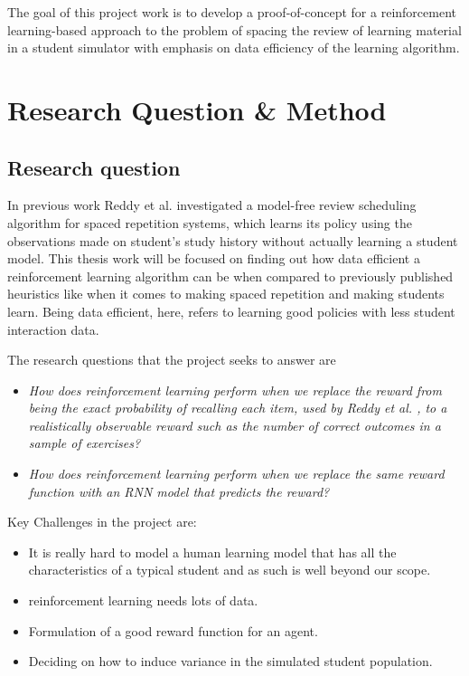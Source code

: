 \documentclass[12pt]{article}
\begin{document}
The goal of this project work is to develop a proof-of-concept for a reinforcement learning-based approach to the problem of spacing the review of learning material in a student simulator with emphasis on data efficiency of the learning algorithm.


\section{Research Question \& Method}
\subsection{Research question}
In previous work Reddy et al. \cite{reddy} investigated a model-free review scheduling algorithm for spaced repetition systems{\color{blue},} which learns its policy using the observations made on student’s study history without actually learning a student model. This thesis work will be focused on finding out how data efficient a reinforcement learning algorithm can be when compared to previously published heuristics like \cite{leitner} when it comes to making spaced repetition and making students learn. {\color{blue}Being data efficient, here, refers to learning good policies with less student interaction data}. 


{\color{blue}
The research questions that the project seeks to answer are\\

\begin{itemize}
\item
\textit{How does reinforcement learning perform when we replace the reward from being the exact probability of recalling each item, used by Reddy et al. \cite{reddy}, to a realistically observable reward such as the number of correct outcomes in a sample of exercises?}
\item
\textit{How does reinforcement learning perform when we replace the same reward function with an RNN model that predicts the reward?}
\end{itemize}
}
{\color{blue}Key Challenges in the project are:}
\begin{itemize}
    \item It is really hard to model a human learning model that has all the characteristics of a typical student and as such is well beyond our scope.
    \item reinforcement learning needs lots of data.
    \item Formulation of a good reward function for an agent.
    \item Deciding on how to induce variance in the simulated student population.
\end{itemize}
\end{document}
